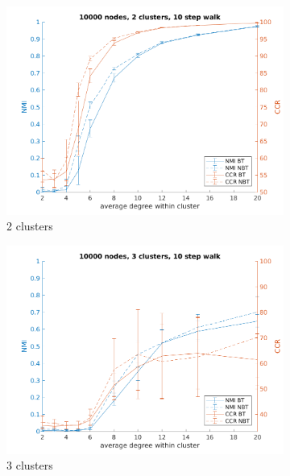 \documentclass{article} %
\begin{document}
\begin{figure}[H] %
    \begin{subfigure}{0.33\textwidth}
        \includegraphics[width=\linewidth]{fig4/N10000K2len10} 
        \caption{2 clusters}
        \label{fig:subim41}
    \end{subfigure}
    \begin{subfigure}{0.33\textwidth}
        \includegraphics[width=\linewidth]{fig4/N10000K3len10}
        \caption{3 clusters}
        \label{fig:subim42}
    \end{subfigure}
    \begin{subfigure}{0.33\textwidth}

\end{subfigure}
\end{figure}
\end{document}
